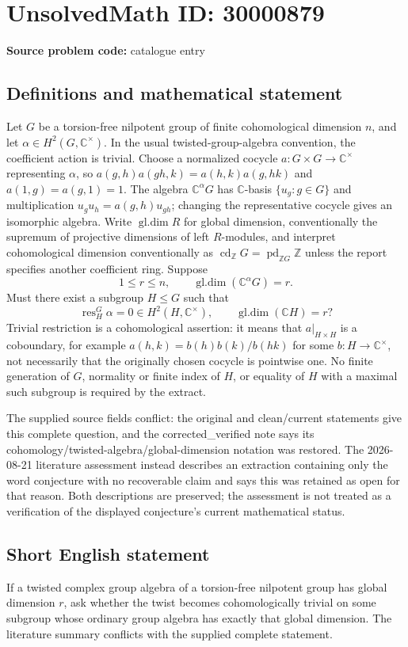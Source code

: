 \documentclass[11pt]{article}
\newcommand{\Z}{\mathbb{Z}}
\newcommand{\C}{\mathbb{C}}
\begin{document}
\section*{UnsolvedMath ID: 30000879}
\textbf{Source problem code:} catalogue entry
\subsection{Definitions and mathematical statement}
Let $G$ be a torsion-free nilpotent group of finite cohomological dimension $n$, and let $\alpha\in H^2(G,\C^\times)$. In the usual twisted-group-algebra convention, the coefficient action is trivial. Choose a normalized cocycle $a:G\times G\to\C^\times$ representing $\alpha$, so $a(g,h)a(gh,k)=a(h,k)a(g,hk)$ and $a(1,g)=a(g,1)=1$. The algebra $\C^\alpha G$ has $\C$-basis $\{u_g:g\in G\}$ and multiplication $u_gu_h=a(g,h)u_{gh}$; changing the representative cocycle gives an isomorphic algebra. Write $\operatorname{gl.dim}R$ for global dimension, conventionally the supremum of projective dimensions of left $R$-modules, and interpret cohomological dimension conventionally as $\operatorname{cd}_{\Z}G=\operatorname{pd}_{\Z G}\Z$ unless the report specifies another coefficient ring. Suppose \[1\leq r\leq n,\qquad \operatorname{gl.dim}(\C^\alpha G)=r.\] Must there exist a subgroup $H\leq G$ such that \[\operatorname{res}^G_H\alpha=0\in H^2(H,\C^\times),\qquad\operatorname{gl.dim}(\C H)=r?\] Trivial restriction is a cohomological assertion: it means that $a|_{H\times H}$ is a coboundary, for example $a(h,k)=b(h)b(k)/b(hk)$ for some $b:H\to\C^\times$, not necessarily that the originally chosen cocycle is pointwise one. No finite generation of $G$, normality or finite index of $H$, or equality of $H$ with a maximal such subgroup is required by the extract.\par The supplied source fields conflict: the original and clean/current statements give this complete question, and the corrected\_verified note says its cohomology/twisted-algebra/global-dimension notation was restored. The 2026-08-21 literature assessment instead describes an extraction containing only the word conjecture with no recoverable claim and says this was retained as open for that reason. Both descriptions are preserved; the assessment is not treated as a verification of the displayed conjecture's current mathematical status.
\subsection{Short English statement}
If a twisted complex group algebra of a torsion-free nilpotent group has global dimension $r$, ask whether the twist becomes cohomologically trivial on some subgroup whose ordinary group algebra has exactly that global dimension. The literature summary conflicts with the supplied complete statement.
\end{document}
